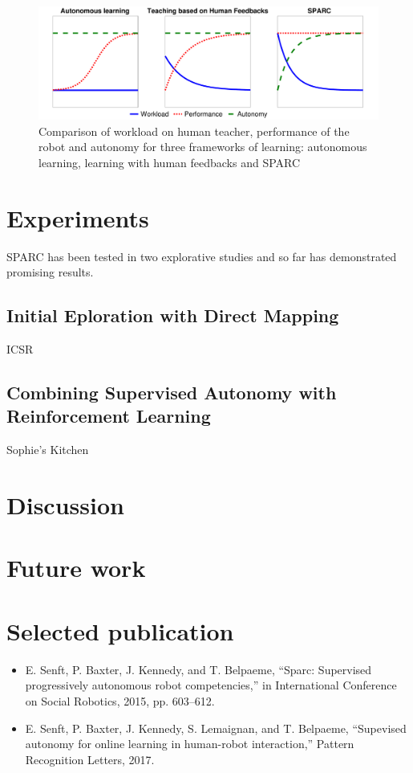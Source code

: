 \documentclass[conference]{IEEEtran}
\begin{document}
\begin{figure}
    \centering
    \includegraphics[width=0.9\linewidth]{motivation.pdf}
    \caption{Comparison of workload on human teacher, performance of the robot
    and autonomy for three frameworks of learning: autonomous learning, learning
    with human feedbacks and SPARC}
    \label{fig:comparison}
\end{figure}

\section{Experiments}

SPARC has been tested in two explorative studies and so far has demonstrated
promising results.

\subsection{Initial Eploration with Direct Mapping}
ICSR
\subsection{Combining Supervised Autonomy with Reinforcement Learning}
Sophie's Kitchen

\section{Discussion}

\section{Future work}

\section*{Selected publication}
\begin{itemize}
        \item E. Senft, P. Baxter, J. Kennedy, and T. Belpaeme, “Sparc:
            Supervised progressively autonomous robot competencies,” in
            International Conference on Social Robotics, 2015, pp. 603–612.
        \item E. Senft, P. Baxter, J. Kennedy, S. Lemaignan, and T. Belpaeme,
            “Supevised autonomy for online learning in human-robot interaction,”
            Pattern Recognition Letters, 2017. %
\end{itemize}


% 
\end{document}
